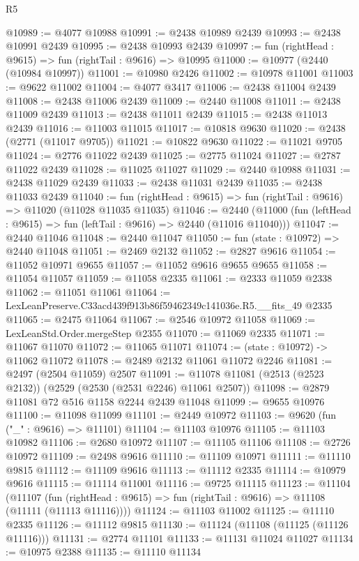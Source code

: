 \begin{lexlean}{R5}
\begin{coremodule}
@10989 := @4077 @10988
@10991 := @2438 @10989 @2439
@10993 := @2438 @10991 @2439
@10995 := @2438 @10993 @2439
@10997 := fun (rightHead : @9615) => fun (rightTail : @9616) => @10995
@11000 := @10977 (@2440 (@10984 @10997))
@11001 := @10980 @2426
@11002 := @10978 @11001
@11003 := @9622 @11002
@11004 := @4077 @3417
@11006 := @2438 @11004 @2439
@11008 := @2438 @11006 @2439
@11009 := @2440 @11008
@11011 := @2438 @11009 @2439
@11013 := @2438 @11011 @2439
@11015 := @2438 @11013 @2439
@11016 := @11003 @11015
@11017 := @10818 @9630
@11020 := @2438 (@2771 (@11017 @9705))
@11021 := @10822 @9630
@11022 := @11021 @9705
@11024 := @2776 @11022 @2439
@11025 := @2775 @11024
@11027 := @2787 @11022 @2439
@11028 := @11025 @11027
@11029 := @2440 @10988
@11031 := @2438 @11029 @2439
@11033 := @2438 @11031 @2439
@11035 := @2438 @11033 @2439
@11040 := fun (rightHead : @9615) => fun (rightTail : @9616) => @11020 (@11028 @11035 @11035)
@11046 := @2440 (@11000 (fun (leftHead : @9615) => fun (leftTail : @9616) => @2440 (@11016 @11040)))
@11047 := @2440 @11046
@11048 := @2440 @11047
@11050 := fun (state : @10972) => @2440 @11048
@11051 := @2469 @2132
@11052 := @2827 @9616
@11054 := @11052 @10971 @9655
@11057 := @11052 @9616 @9655 @9655
@11058 := @11054 @11057
@11059 := @11058 @2335
@11061 := @2333 @11059 @2338
@11062 := @11051 @11061
@11064 := LexLeanPreserve.C33acd439f913b86f59462349c141036e.R5.__fits_49 @2335
@11065 := @2475 @11064
@11067 := @2546 @10972 @11058
@11069 := LexLeanStd.Order.mergeStep @2355
@11070 := @11069 @2335
@11071 := @11067 @11070
@11072 := @11065 @11071
@11074 := (state : @10972) -> @11062 @11072
@11078 := @2489 @2132 @11061 @11072 @2246
@11081 := @2497 (@2504 @11059) @2507
@11091 := @11078 @11081 (@2513 (@2523 @2132)) (@2529 (@2530 (@2531 @2246) @11061 @2507))
@11098 := @2879 @11081 @72 @516 @1158 @2244 @2439 @11048
@11099 := @9655 @10976
@11100 := @11098 @11099
@11101 := @2449 @10972
@11103 := @9620 (fun ("_" : @9616) => @11101)
@11104 := @11103 @10976
@11105 := @11103 @10982
@11106 := @2680 @10972
@11107 := @11105 @11106
@11108 := @2726 @10972
@11109 := @2498 @9616
@11110 := @11109 @10971
@11111 := @11110 @9815
@11112 := @11109 @9616
@11113 := @11112 @2335
@11114 := @10979 @9616
@11115 := @11114 @11001
@11116 := @9725 @11115
@11123 := @11104
    (@11107 (fun (rightHead : @9615) => fun (rightTail : @9616) => @11108 (@11111 (@11113 @11116))))
@11124 := @11103 @11002
@11125 := @11110 @2335
@11126 := @11112 @9815
@11130 := @11124 (@11108 (@11125 (@11126 @11116)))
@11131 := @2774 @11101
@11133 := @11131 @11024 @11027
@11134 := @10975 @2388
@11135 := @11110 @11134

\end{coremodule}
\end{lexlean}
